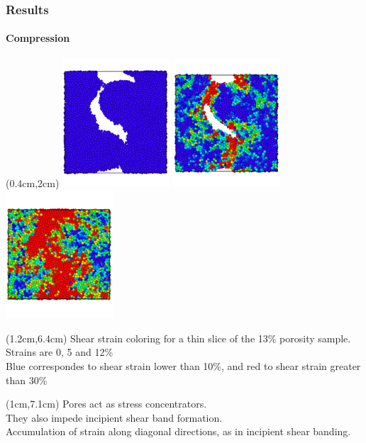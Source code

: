 \documentclass[12pt,t]{beamer}
\begin{document}
\begin{frame}
    \frametitle{Results}
    \framesubtitle{Compression}
    \begin{textblock*}{6.5cm}(0.4cm,2cm) %
        \includegraphics[width=4cm]{Presentacion_PANACM_Franco/13_0strain.png}
        \includegraphics[width=4cm]{Presentacion_PANACM_Franco/13_5strain_comp.png}
        \includegraphics[width=4cm]{Presentacion_PANACM_Franco/13_12strain_comp.png}
    \end{textblock*}
    \begin{textblock*}{11cm}(1.2cm,6.4cm) %
        \centering
        \tiny{Shear strain coloring for a thin slice of the 13\% porosity sample. Strains are 0, 5 and 12\%\\Blue correspondes to shear strain lower than 10\%, and red to shear strain greater than 30\%}
    \end{textblock*}
    \begin{textblock*}{11cm}(1cm,7.1cm) %
        Pores act as stress concentrators.\\
        They also impede incipient shear band formation.\\
        Accumulation of strain along diagonal directions, as in incipient shear banding.
    \end{textblock*}
\end{frame}
\end{document}
